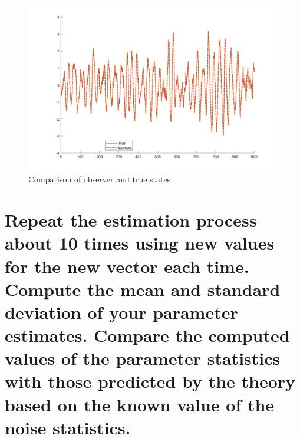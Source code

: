 \documentclass[12pt,letterpaper, onecolumn]{exam}
\begin{document}
\begin{questions}
\begin{parts}
\begin{subparts}
            \begin{figure}[!h]
                \centering
                \includegraphics[width=\linewidth]{output_4b.png}
                \caption{Comparison of observer and true states}
                \label{fig:7}
            \end{figure}
        \end{subparts}

        \clearpage
        \part{Repeat the estimation process about 10 times using new values for the new vector each time. Compute the mean and standard deviation of your parameter estimates. Compare the computed values of the parameter statistics with those predicted by the theory based on the known value of the noise statistics.}


\end{parts}
\end{questions}
\end{document}
